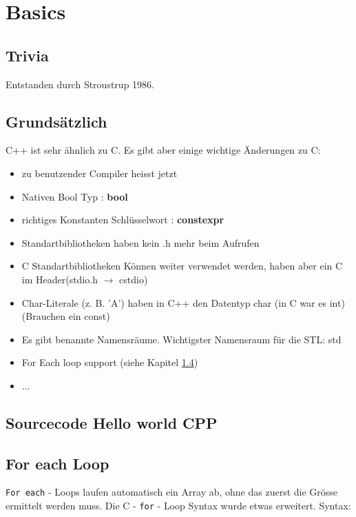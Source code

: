 \section{Basics}

\subsection{Trivia}

Entstanden durch Stroustrup 1986.

\subsection{Grundsätzlich}

C++ ist sehr ähnlich zu C. Es gibt aber einige wichtige Änderungen zu C:

\begin{itemize}[itemsep=1pt, parsep=0pt]
    \item zu benutzender Compiler heisst jetzt 
    \item Nativen Bool Typ : \textbf{bool}
    \item richtiges Konstanten Schlüsselwort : \textbf{constexpr}
    \item Standartbibliotheken haben kein .h mehr beim Aufrufen
    \item C Standartbibliotheken Können weiter verwendet werden, haben aber ein C im Header(stdio.h $\rightarrow$ cstdio)
    \item Char-Literale (z. B. 'A') haben in C++ den Datentyp char (in C war es int)(Brauchen ein const)
    \item Es gibt benannte Namensräume. Wichtigster Namensraum für die STL: std
    \item For Each loop support (siehe Kapitel \ref{forEach})
    \item ...
\end{itemize}

\subsection{Sourcecode Hello world CPP}



\subsection{For each Loop}\label{forEach}

\verb|For each| - Loops laufen automatisch ein Array ab, ohne das zuerst die Grösse ermittelt werden muss. 
Die C - \verb|for| - Loop Syntax wurde etwas erweitert.
Syntax:

